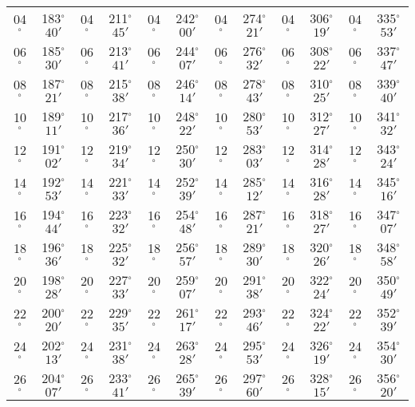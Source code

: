 \begin{table}
{\begin{tabular}{cc|cc|cc|cc|cc|cc}
04$^\circ$ & 183$^\circ$$40'$ & 04$^\circ$ & 211$^\circ$$45'$ & 04$^\circ$ & 242$^\circ$$00'$ & 04$^\circ$ & 274$^\circ$$21'$ &  04$^\circ$ & 306$^\circ$$19'$ & 04$^\circ$ & 335$^\circ$$53'$\\
06$^\circ$ & 185$^\circ$$30'$ & 06$^\circ$ & 213$^\circ$$41'$ & 06$^\circ$ & 244$^\circ$$07'$ & 06$^\circ$ & 276$^\circ$$32'$ &  06$^\circ$ & 308$^\circ$$22'$ & 06$^\circ$ & 337$^\circ$$47'$\\
08$^\circ$ & 187$^\circ$$21'$ & 08$^\circ$ & 215$^\circ$$38'$ & 08$^\circ$ & 246$^\circ$$14'$ & 08$^\circ$ & 278$^\circ$$43'$ &  08$^\circ$ & 310$^\circ$$25'$ & 08$^\circ$ & 339$^\circ$$40'$\\
10$^\circ$ & 189$^\circ$$11'$ & 10$^\circ$ & 217$^\circ$$36'$ & 10$^\circ$ & 248$^\circ$$22'$ & 10$^\circ$ & 280$^\circ$$53'$ &  10$^\circ$ & 312$^\circ$$27'$ & 10$^\circ$ & 341$^\circ$$32'$\\
12$^\circ$ & 191$^\circ$$02'$ & 12$^\circ$ & 219$^\circ$$34'$ & 12$^\circ$ & 250$^\circ$$30'$ & 12$^\circ$ & 283$^\circ$$03'$ &  12$^\circ$ & 314$^\circ$$28'$ & 12$^\circ$ & 343$^\circ$$24'$\\
14$^\circ$ & 192$^\circ$$53'$ & 14$^\circ$ & 221$^\circ$$33'$ & 14$^\circ$ & 252$^\circ$$39'$ & 14$^\circ$ & 285$^\circ$$12'$ &  14$^\circ$ & 316$^\circ$$28'$ & 14$^\circ$ & 345$^\circ$$16'$\\
16$^\circ$ & 194$^\circ$$44'$ & 16$^\circ$ & 223$^\circ$$32'$ & 16$^\circ$ & 254$^\circ$$48'$ & 16$^\circ$ & 287$^\circ$$21'$ &  16$^\circ$ & 318$^\circ$$27'$ & 16$^\circ$ & 347$^\circ$$07'$\\
18$^\circ$ & 196$^\circ$$36'$ & 18$^\circ$ & 225$^\circ$$32'$ & 18$^\circ$ & 256$^\circ$$57'$ & 18$^\circ$ & 289$^\circ$$30'$ &  18$^\circ$ & 320$^\circ$$26'$ & 18$^\circ$ & 348$^\circ$$58'$\\
20$^\circ$ & 198$^\circ$$28'$ & 20$^\circ$ & 227$^\circ$$33'$ & 20$^\circ$ & 259$^\circ$$07'$ & 20$^\circ$ & 291$^\circ$$38'$ &  20$^\circ$ & 322$^\circ$$24'$ & 20$^\circ$ & 350$^\circ$$49'$\\
22$^\circ$ & 200$^\circ$$20'$ & 22$^\circ$ & 229$^\circ$$35'$ & 22$^\circ$ & 261$^\circ$$17'$ & 22$^\circ$ & 293$^\circ$$46'$ &  22$^\circ$ & 324$^\circ$$22'$ & 22$^\circ$ & 352$^\circ$$39'$\\
24$^\circ$ & 202$^\circ$$13'$ & 24$^\circ$ & 231$^\circ$$38'$ & 24$^\circ$ & 263$^\circ$$28'$ & 24$^\circ$ & 295$^\circ$$53'$ &  24$^\circ$ & 326$^\circ$$19'$ & 24$^\circ$ & 354$^\circ$$30'$\\
26$^\circ$ & 204$^\circ$$07'$ & 26$^\circ$ & 233$^\circ$$41'$ & 26$^\circ$ & 265$^\circ$$39'$ & 26$^\circ$ & 297$^\circ$$60'$ &  26$^\circ$ & 328$^\circ$$15'$ & 26$^\circ$ & 356$^\circ$$20'$\\

\end{tabular}}
\end{table}
